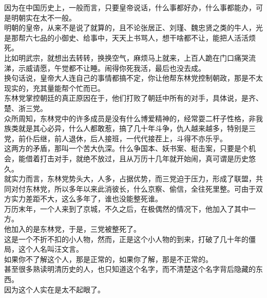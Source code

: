 \begin{multicols}{\theparacolNo}
因为在中国历史上，一般而言，只要皇帝说话，什么事都好办，什么事都能办，可是明朝实在太不一般。\\

明朝的皇帝，从来不是说了就算的，且不论张居正、刘瑾、魏忠贤之类的牛人，光是那帮六七品的小御史、给事中，天天上书骂人，想干啥都不让，能把人活活烦死。\\

比如明武宗，就想出去转转，换换空气，麻烦马上就来，上百人跪在门口痛哭流涕，示威请愿，午觉都不让睡。闹得你死我活，最后也没去成。\\

换句话说，皇帝大人连自己的事情都搞不定，你让他帮东林党控制朝政，那是不太现实的，充其量能帮个忙而已。\\

东林党掌控朝廷的真正原因在于，他们打败了朝廷中所有的对手，具体说，是齐、楚、浙三党。\\

众所周知，东林党中的许多成员是没有什么博爱精神的，经常耍二杆子性格，非我族类就是其心必异，什么人都敢惹，搞了几十年斗争，仇人越来越多，特别是三党，前仆后继，前人退休，后人接班，一代代接茬上，斗得不亦乐乎。\\

这两方的矛盾，那叫一个苦大仇深。什么争国本、妖书案、梃击案，只要是个机会，能借着打击对手，就绝不放过，且从万历十几年就开始闹，真可谓是历史悠久。\\

就实力而言，东林党势头大，人多，占据优势，而三党迫于压力，形成了联盟，共同对付东林党，所以多年以来此消彼长，什么京察、偷信，全往死里整。可由于双方实力差距不大，这么多年了，谁也没能整死谁。\\

万历末年，一个人来到了京城，不久之后，在极偶然的情况下，他加入了其中一方。\\

他加入的是东林党，于是，三党被整死了。\\

这是一个不折不扣的小人物，然而，正是这个小人物的到来，打破了几十年的僵局，这个人名叫汪文言。\\

如果你不了解这个人，那是正常的，如果你了解，那是不正常的。\\

甚至很多熟读明清历史的人，也只知道这个名字，而不清楚这个名字背后隐藏的东西。\\

因为这个人实在是太不起眼了。\\


\end{multicols}
